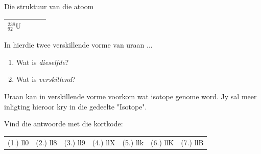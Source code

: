 \begin{exercises}{Die struktuur van die atoom}
\begin{enumerate}[noitemsep, label=\textbf{\arabic*}. ]
\begin{table}[H]
\begin{center}
\begin{tabular}{|l|l|l|l|}
        $_{92}^{238}\text{U}$ &
         &
         &
     \\ \hline
    \end{tabular}
      \end{center}
\end{table}
    \par
In hierdie twee verskillende vorme van uraan ...
\label{m38745*id257277}\begin{enumerate}[noitemsep, label=\textbf{\alph*}. ] 
            \label{m38745*uid38}\item Wat is \textsl{dieselfde}?
\label{m38745*uid39}\item Wat is \textsl{verskillend}?
\end{enumerate}
Uraan kan in verskillende vorme voorkom wat isotope genome word. Jy sal meer inligting hieroor kry in die gedeelte "Isotope".\newline
\end{enumerate}
  \label{m38745**end}
\par {} Vind die antwoorde met die kortkode:
 \par \begin{tabular}[h]{cccccc}
 (1.) ll0  &  (2.) ll8  &  (3.) ll9  &  (4.) llX  &  (5.) llk  &  (6.) llK  &  (7.) llB  & \end{tabular}
\end{exercises}
